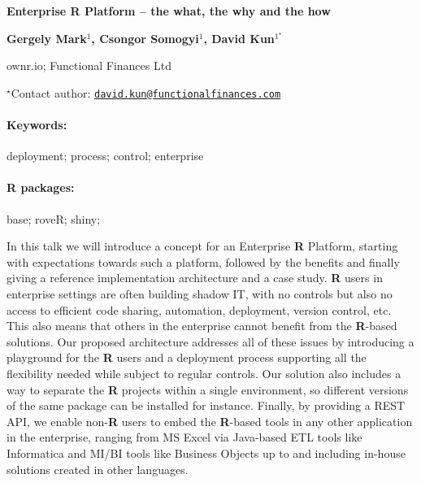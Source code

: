 \documentclass[11pt, a4paper]{article}
\renewcommand{\title}[1]{\begin{center}{\bf \LARGE #1}\end{center}}
\newcommand{\keywords}{\paragraph{Keywords:}}
\newcommand{\packages}{\paragraph{R packages:}}
\begin{document}
\pagestyle{empty}

\title{Enterprise R Platform -- the what, the why and the how}

\begin{center}
  {\bf Gergely Mark$^{1}$, Csongor Somogyi$^{1}$, David Kun$^{1^\star}$}
\end{center}

\vskip 0.3cm

\begin{affiliations}
\begin{enumerate}
\begin{minipage}{0.915\textwidth}
\centering
\item ownr.io; Functional Finances Ltd \\[-2pt]
\end{minipage}
\end{enumerate}
$^\star$Contact author: \href{mailto:david.kun@functionalfinances.com}{\nolinkurl{david.kun@functionalfinances.com}}\\
\end{affiliations}

\vskip 0.5cm

\begin{minipage}{0.915\textwidth}
\keywords deployment; process; control; enterprise
\packages base; roveR; shiny;
\end{minipage}

\vskip 0.8cm

In this talk we will introduce a concept for an Enterprise \textbf{R}
Platform, starting with expectations towards such a platform, followed
by the benefits and finally giving a reference implementation
architecture and a case study. \textbf{R} users in enterprise settings
are often building shadow IT, with no controls but also no access to
efficient code sharing, automation, deployment, version control, etc.
This also means that others in the enterprise cannot benefit from the
\textbf{R}-based solutions. Our proposed architecture addresses all of
these issues by introducing a playground for the \textbf{R} users and a
deployment process supporting all the flexibility needed while subject
to regular controls. Our solution also includes a way to separate the
\textbf{R} projects within a single environment, so different versions
of the same package can be installed for instance. Finally, by providing
a REST API, we enable non-\textbf{R} users to embed the \textbf{R}-based
tools in any other application in the enterprise, ranging from MS Excel
via Java-based ETL tools like Informatica and MI/BI tools like Business
Objects up to and including in-house solutions created in other
languages.
\end{document}
